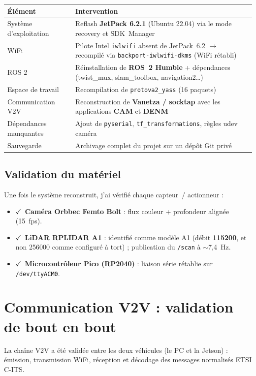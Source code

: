 \documentclass[11pt,a4paper]{article}
\newcommand{\ok}{\textcolor{progreen}{$\checkmark$}}
\begin{document}
\begin{center}
\renewcommand{\arraystretch}{1.25}
\begin{tabular}{@{}p{5.3cm}p{9.2cm}@{}}
\toprule
\textbf{Élément} & \textbf{Intervention} \\
\midrule
Système d'exploitation & Reflash \textbf{JetPack 6.2.1} (Ubuntu 22.04) via le mode recovery et SDK~Manager \\
WiFi & Pilote Intel \texttt{iwlwifi} absent de JetPack~6.2 $\rightarrow$ recompilé via \texttt{backport-iwlwifi-dkms} (WiFi rétabli) \\
ROS 2 & Réinstallation de \textbf{ROS~2 Humble} + dépendances (twist\_mux, slam\_toolbox, navigation2\ldots) \\
Espace de travail & Recompilation de \texttt{protova2\_yass} (16 paquets) \\
Communication V2V & Reconstruction de \textbf{Vanetza / socktap} avec les applications \textbf{CAM} et \textbf{DENM} \\
Dépendances manquantes & Ajout de \texttt{pyserial}, \texttt{tf\_transformations}, règles udev caméra \\
Sauvegarde & Archivage complet du projet sur un dépôt Git privé \\
\bottomrule
\end{tabular}
\end{center}

\subsection{Validation du matériel}
Une fois le système reconstruit, j'ai vérifié chaque capteur~/ actionneur :
\begin{itemize}[leftmargin=1.4em,itemsep=1pt]
  \item \ok~\textbf{Caméra Orbbec Femto Bolt} : flux couleur + profondeur alignée (15~fps).
  \item \ok~\textbf{LiDAR RPLIDAR A1} : identifié comme modèle A1 (débit \textbf{115200}, et non 256000 comme configuré à tort) ; publication du \texttt{/scan} à $\sim$7,4~Hz.
  \item \ok~\textbf{Microcontrôleur Pico (RP2040)} : liaison série rétablie sur \texttt{/dev/ttyACM0}.
\end{itemize}

\section{Communication V2V : validation de bout en bout}
La chaîne V2V a été validée entre les deux véhicules (le PC et la Jetson) : émission,
transmission WiFi, réception et décodage des messages normalisés ETSI C-ITS.
\end{document}

